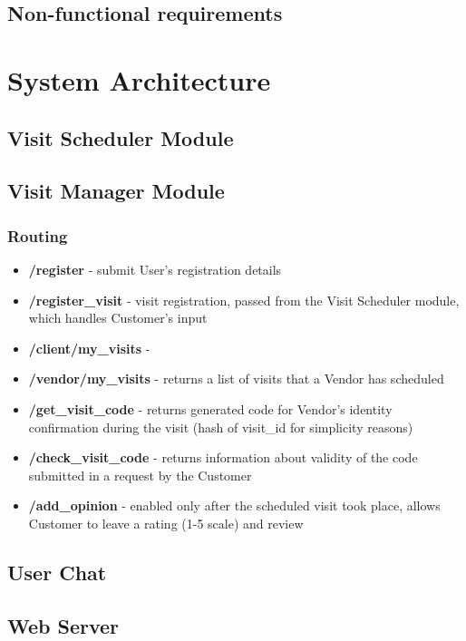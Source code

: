 \documentclass[11pt,a4paper]{article}
\begin{document}
\subsection{Non-functional requirements}

\section{System Architecture}

\subsection{Visit Scheduler Module}

\subsection{Visit Manager Module}

\subsubsection{Routing}
\begin{itemize}
\item \textbf{\slash register} - submit User's registration details
\item \textbf{\slash register\_visit} - visit registration, passed from the Visit Scheduler module, which handles Customer's input
\item \textbf{\slash client/my\_visits} - 
\item \textbf{\slash vendor/my\_visits} - returns a list of visits that a Vendor has scheduled
\item \textbf{\slash get\_visit\_code} - returns generated code for Vendor's identity confirmation during the visit (hash of visit\_id for simplicity reasons)
\item \textbf{\slash check\_visit\_code} - returns information about validity of the code submitted in a request by the Customer
\item \textbf{\slash add\_opinion} - enabled only after the scheduled visit took place, allows Customer to leave a rating (1-5 scale) and review
\end{itemize}


\subsection{User Chat}

\subsection{Web Server}
\end{document}
